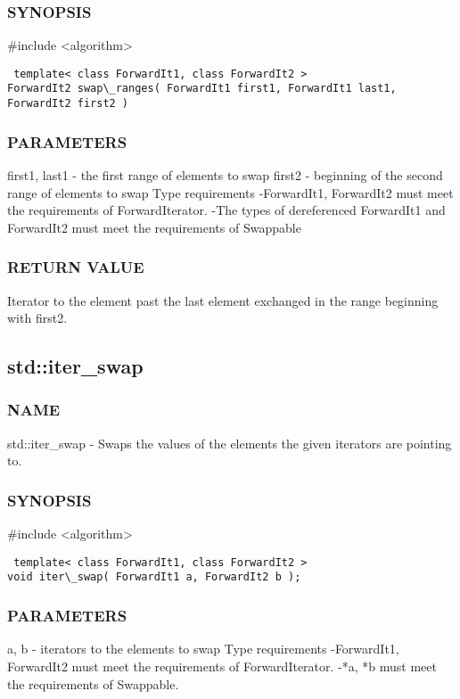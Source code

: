 \subsubsection{SYNOPSIS}
\#include <algorithm>

\begin{lstlisting}
 template< class ForwardIt1, class ForwardIt2 >
ForwardIt2 swap\_ranges( ForwardIt1 first1, ForwardIt1 last1, ForwardIt2 first2 )
\end{lstlisting}

\subsubsection{PARAMETERS}
first1, last1 - the first range of elements to swap
first2 - beginning of the second range of elements to swap
 Type requirements
 -ForwardIt1, ForwardIt2 must meet the requirements of ForwardIterator.
 -The types of dereferenced ForwardIt1 and ForwardIt2 must meet the requirements of Swappable

\subsubsection{RETURN VALUE}
Iterator to the element past the last element exchanged in the range beginning with first2.



\subsection{std::iter\_swap}

\subsubsection{NAME}
std::iter\_swap - Swaps the values of the elements the given iterators are pointing to.

\subsubsection{SYNOPSIS}
\#include <algorithm>

\begin{lstlisting}
 template< class ForwardIt1, class ForwardIt2 >
void iter\_swap( ForwardIt1 a, ForwardIt2 b );
\end{lstlisting}

\subsubsection{PARAMETERS}
a, b - iterators to the elements to swap
 Type requirements
 -ForwardIt1, ForwardIt2 must meet the requirements of ForwardIterator.
 -*a, *b must meet the requirements of Swappable.

